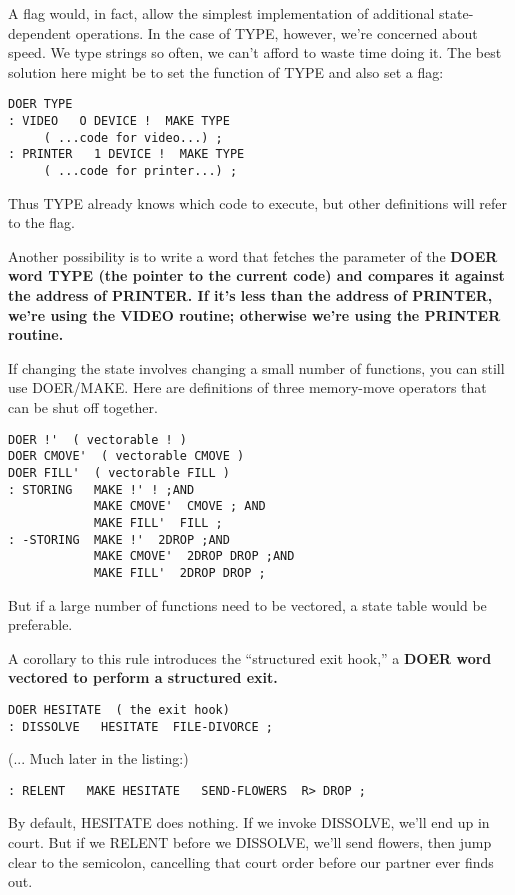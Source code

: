A flag would, in fact, allow the simplest implementation of additional
state-dependent operations. In the case of TYPE, however, we're
concerned about speed. We type strings so often, we can't afford to waste
time doing it. The best solution here might be to set the function of
TYPE and also set a flag:

\begin{verbatim}
DOER TYPE
: VIDEO   O DEVICE !  MAKE TYPE
     ( ...code for video...) ;
: PRINTER   1 DEVICE !  MAKE TYPE
     ( ...code for printer...) ;
\end{verbatim}

Thus TYPE already knows which code to execute, but other definitions
will refer to the flag.

Another possibility is to write a word that fetches the parameter of
the \bf{DOER} word TYPE (the pointer to the current code) and compares it
against the address of PRINTER. If it's less than the address of
PRINTER, we're using the VIDEO routine; otherwise we're using the
PRINTER routine.

If changing the state involves changing a small number of functions,
you can still use DOER/MAKE. Here are definitions of three
memory-move operators that can be shut off together.

\begin{verbatim}
DOER !'  ( vectorable ! )
DOER CMOVE'  ( vectorable CMOVE )
DOER FILL'  ( vectorable FILL )
: STORING   MAKE !' ! ;AND
            MAKE CMOVE'  CMOVE ; AND
            MAKE FILL'  FILL ;
: -STORING  MAKE !'  2DROP ;AND
            MAKE CMOVE'  2DROP DROP ;AND
            MAKE FILL'  2DROP DROP ;
\end{verbatim}

But if a large number of functions need to be vectored, a state table
would be preferable.

A corollary to this rule introduces the ``structured exit hook,'' a
\bf{DOER} word vectored to perform a structured exit.

\begin{verbatim}
DOER HESITATE  ( the exit hook)
: DISSOLVE   HESITATE  FILE-DIVORCE ;
\end{verbatim}
(... Much later in the listing:)
\begin{verbatim}
: RELENT   MAKE HESITATE   SEND-FLOWERS  R> DROP ;
\end{verbatim}

By default, HESITATE does nothing. If we invoke DISSOLVE, we'll
end up in court. But if we RELENT before we DISSOLVE, we'll send
flowers, then jump clear to the semicolon, cancelling that court order
before our partner ever finds out.


